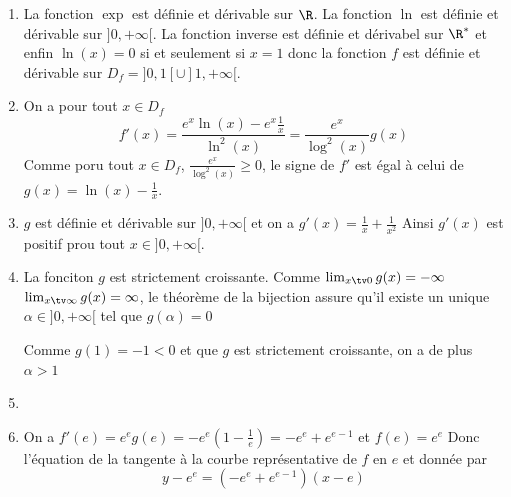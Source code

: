 \begin{correction}
\begin{enumerate}
\item La fonction $\exp$ est définie  et dérivable sur $\R$. La fonction $ \ln$ est définie et dérivable sur $]0,+\infty[$. La fonction inverse est définie et dérivabel sur $\R^*$ et enfin $\ln(x) =0$ si et seulement si $x=1$ donc la fonction $f$ est définie  et dérivable sur $D_f= ]0,1[\cup]1,+\infty[$. 
\item On  a pour tout $x\in D_f$ 
$$f'(x)=\frac{e^x \ln(x)- e^x\frac{1}{x}}{\ln^2(x)} = \frac{e^x}{\log^2(x)} g(x) $$
Comme poru tout $x\in D_f$, $\frac{e^x}{\log^2(x)}\geq 0$, 
 le signe de $f'$ est égal à celui de $g(x)=\ln(x)-\frac{1}{x}$. 
 
 \item $g$ est définie et dérivable sur $]0,+\infty[$ et on a $g'(x)=\frac{1}{x}+\frac{1}{x^2}$ Ainsi $g'(x)$ est positif prou tout $x\in  ]0,+\infty[$. 
 
 \item La fonciton $g$ est strictement croissante. Comme $\lim_{x\tv 
 0} g(x)  = -\infty$ $\lim_{x\tv 
 \infty } g(x)  = \infty$, le théorème de la bijection assure qu'il existe un unique $\alpha \in ]0,+\infty[ $ tel que $g(\alpha) =0$ 
 
 Comme $g(1) = -1 < 0$ et que $g$ est strictement croissante, on a de plus $\alpha>1$ 

 \item 
\begin{center}
\end{center}


\item On a $f'(e) = e^e g(e) = -e^e(1-\frac{1}{e})  =-e^{e}+e^{e-1}$ et $f(e) = e^{e}$
Donc l'équation de la tangente à la courbe représentative de $f$ en $e$ et donnée par 
$$y-e^{e} =(-e^{e}+e^{e-1} )(x-e)$$
\end{enumerate}
\end{correction}


